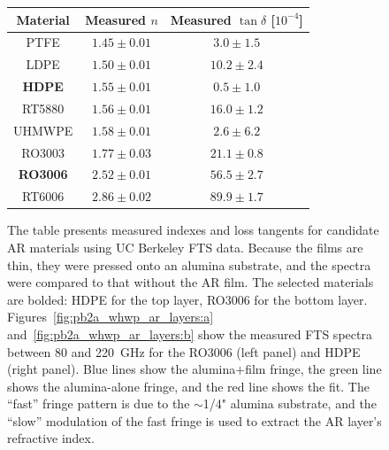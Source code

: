 \begin{figure}[!t]
    \centering
    \begin{tabu}{| c | c | c |}
	\hline
	Material & Measured $n$ & Measured $\tan \delta$ [$10^{-4}$] \\
	\hline
	\hline
	PTFE & $1.45 \pm 0.01$ & $3.0 \pm 1.5$\\
	\hline
	LDPE & $1.50 \pm 0.01$ & $10.2 \pm 2.4$ \\	
	\hline
	\textbf{HDPE} & $1.55 \pm 0.01$ & $0.5 \pm 1.0$ \\	
	\hline
	RT5880 & $1.56 \pm 0.01$ & $16.0 \pm 1.2$ \\ 
	\hline
	UHMWPE & $1.58 \pm 0.01$ & $2.6 \pm 6.2$ \\
	\hline
	RO3003 & $1.77 \pm 0.03$ & $21.1 \pm 0.8$ \\
	\hline
	\textbf{RO3006} & $2.52 \pm 0.01$ & $56.5 \pm 2.7$ \\
	\hline
	RT6006 & $2.86 \pm 0.02$ & $89.9 \pm 1.7$ \\
	\hline
	\end{tabu}
	\centering
    \caption[AR coating candidates for the PB-2a WHWP and their measured indexes and loss tangents, as well as the measured spectra of selected materials.]{The table presents measured indexes and loss tangents for candidate AR materials using UC Berkeley FTS data. Because the films are thin, they were pressed onto an alumina substrate, and the spectra were compared to that without the AR film. The selected materials are bolded: HDPE for the top layer, RO3006 for the bottom layer. Figures~\ref{fig:pb2a_whwp_ar_layers:a} and~\ref{fig:pb2a_whwp_ar_layers:b} show the measured FTS spectra between 80 and 220~GHz for the RO3006 (left panel) and HDPE (right panel). Blue lines show the alumina$+$film fringe, the green line shows the alumina-alone fringe, and the red line shows the fit. The ``fast'' fringe pattern is due to the $\sim$1/4" alumina substrate, and the ``slow'' modulation of the fast fringe is used to extract the AR layer's refractive index.}

\end{figure}

